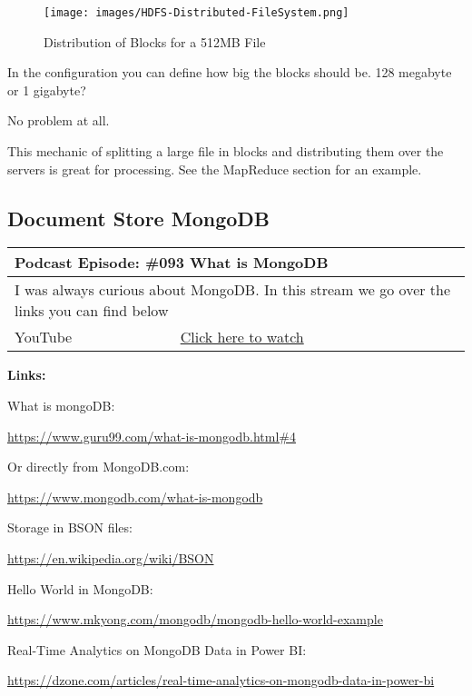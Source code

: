 \documentclass[12pt, numbers=noenddot]{scrreprt} %
\begin{document}
\begin{figure}[htbp]
  \centering
     \texttt{[image: images/HDFS-Distributed-FileSystem.png]}
  \caption{Distribution of Blocks for a 512MB File}
  \label{fig:Bild1}
\end{figure}

In the configuration you can define how big the blocks should be. 128 megabyte or 1 gigabyte?

No problem at all.

This mechanic of splitting a large file in blocks and distributing them over the servers is great for processing.
See the MapReduce section for an example.

\subsection{Document Store MongoDB}

\begin{table}[h]
\begin{tabular}{ll}
\hline
\multicolumn{2}{l}{\textbf{Podcast Episode:} \#093 What is MongoDB} \\ \hline
\multicolumn{2}{p{15cm}}{I was always curious about MongoDB. In this stream we go over the links you can find below}         \\ \hline
\multicolumn{1}{l|}{YouTube}   & \href{https://youtu.be/U05knQN29FA}{Click here to watch}   \\  \hline
\end{tabular}
\end{table}

\textbf{Links:}

What is mongoDB:

\url{https://www.guru99.com/what-is-mongodb.html#4}

Or directly from MongoDB.com:

\url{https://www.mongodb.com/what-is-mongodb}
 
Storage in BSON files:

\url{https://en.wikipedia.org/wiki/BSON}

Hello World in MongoDB:

\url{https://www.mkyong.com/mongodb/mongodb-hello-world-example}

Real-Time Analytics on MongoDB Data in Power BI:

\url{https://dzone.com/articles/real-time-analytics-on-mongodb-data-in-power-bi}
  
\end{document}
